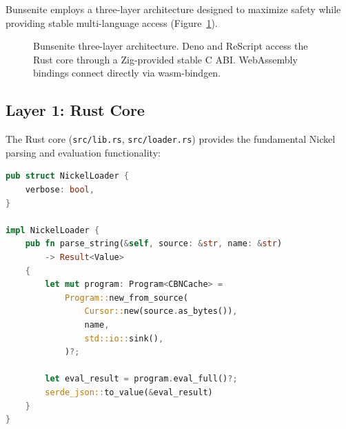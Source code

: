 \documentclass[11pt,a4paper]{article}
\begin{document}
Bunsenite employs a three-layer architecture designed to maximize safety while providing stable multi-language access (Figure~\ref{fig:architecture}).

\begin{figure}[htbp]
\centering
{}
\caption{Bunsenite three-layer architecture. Deno and ReScript access the Rust core through a Zig-provided stable C ABI. WebAssembly bindings connect directly via wasm-bindgen.}
\label{fig:architecture}
\end{figure}

\subsection{Layer 1: Rust Core}

The Rust core (\texttt{src/lib.rs}, \texttt{src/loader.rs}) provides the fundamental Nickel parsing and evaluation functionality:

\begin{lstlisting}[language=Rust,caption={Core NickelLoader implementation}]
pub struct NickelLoader {
    verbose: bool,
}

impl NickelLoader {
    pub fn parse_string(&self, source: &str, name: &str)
        -> Result<Value>
    {
        let mut program: Program<CBNCache> =
            Program::new_from_source(
                Cursor::new(source.as_bytes()),
                name,
                std::io::sink(),
            )?;

        let eval_result = program.eval_full()?;
        serde_json::to_value(&eval_result)
    }
}
\end{lstlisting}
\end{document}
